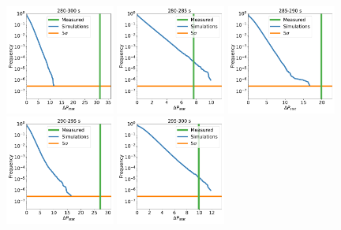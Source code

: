 \documentclass{aastex61}
\begin{document}
\begin{figure}
    \centering
\includegraphics[width=0.32\textwidth]{figures/280-300_log.pdf}
\includegraphics[width=0.32\textwidth]{figures/280-285_log.pdf} 
\includegraphics[width=0.32\textwidth]{figures/285-290_log.pdf}
\includegraphics[width=0.32\textwidth]{figures/290-295_log.pdf}
\includegraphics[width=0.32\textwidth]{figures/295-300_log.pdf}

\end{figure}
\end{document}
